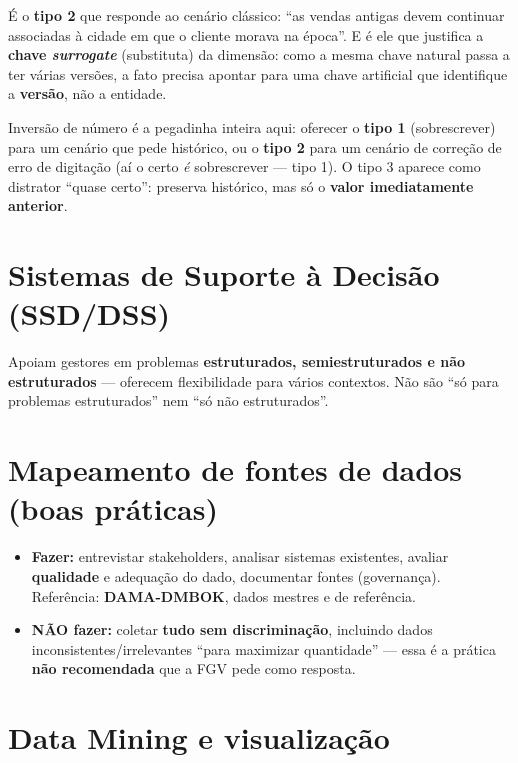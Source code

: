 É o \textbf{tipo 2} que responde ao cenário clássico: ``as vendas antigas
devem continuar associadas à cidade em que o cliente morava na época''. E é
ele que justifica a \textbf{chave \textit{surrogate}} (substituta) da
dimensão: como a mesma chave natural passa a ter várias versões, a fato
precisa apontar para uma chave artificial que identifique a \textbf{versão},
não a entidade.

\begin{pegadinha}
Inversão de número é a pegadinha inteira aqui: oferecer o \textbf{tipo 1}
(sobrescrever) para um cenário que pede histórico, ou o \textbf{tipo 2} para
um cenário de correção de erro de digitação (aí o certo \emph{é} sobrescrever
--- tipo 1). O tipo 3 aparece como distrator ``quase certo'': preserva
histórico, mas só o \textbf{valor imediatamente anterior}.
\end{pegadinha}

\section{Sistemas de Suporte à Decisão (SSD/DSS)}

Apoiam gestores em problemas \textbf{estruturados, semiestruturados e não
estruturados} --- oferecem flexibilidade para vários contextos. Não são ``só
para problemas estruturados'' nem ``só não estruturados''.

\section{Mapeamento de fontes de dados (boas práticas)}

\begin{itemize}
\item \textbf{Fazer:} entrevistar stakeholders, analisar sistemas
existentes, avaliar \textbf{qualidade} e adequação do dado, documentar fontes
(governança). Referência: \textbf{DAMA-DMBOK}, dados mestres e de
referência.
\item \textbf{NÃO fazer:} coletar \textbf{tudo sem discriminação}, incluindo
dados inconsistentes/irrelevantes ``para maximizar quantidade'' --- essa é a
prática \textbf{não recomendada} que a FGV pede como resposta.
\end{itemize}

\section{Data Mining e visualização}

